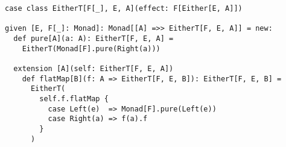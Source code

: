\begin{algorithm}

\begin{verbatim}
case class EitherT[F[_], E, A](effect: F[Either[E, A]])

given [E, F[_]: Monad]: Monad[[A] =>> EitherT[F, E, A]] = new:
  def pure[A](a: A): EitherT[F, E, A] =
    EitherT(Monad[F].pure(Right(a)))

  extension [A](self: EitherT[F, E, A])
    def flatMap[B](f: A => EitherT[F, E, B]): EitherT[F, E, B] =
      EitherT(
        self.f.flatMap {
          case Left(e)  => Monad[F].pure(Left(e))
          case Right(a) => f(a).f
        }
      )
\end{verbatim}

\caption{EitherT monad transformer in Scala. %
\label{monadtransformer:either-t}}
\end{algorithm}